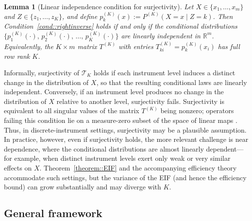 \documentclass[11pt]{article}
\theoremstyle{plain}
\newtheorem{lemma}{Lemma}
\theoremstyle{definition}
\theoremstyle{remark}
\theoremstyle{definition}
\begin{document}
\begin{lemma}[Linear independence condition for surjectivity]
\label{lem:linear-independence}
Let $X \in \{x_1,\ldots,x_m\}$ and $Z \in \{z_1,\ldots,z_K\}$, and define 
$p^{(K)}_k(x) := P^{(K)}(X = x \mid Z = k)$.
Then Condition~\ref{cond::rightinverse} holds if and only if the conditional distributions $\{ p^{(K)}_1(\cdot),\, p^{(K)}_2(\cdot),\,\ldots,\, p^{(K)}_K(\cdot) \}$
are linearly independent in $\mathbb{R}^m$. 
Equivalently, the $K\times m$ matrix $T^{(K)}$ with entries $T_{k i}^{(K)} = p^{(K)}_k(x_i)$ has full row rank $K$.
\end{lemma}
Informally, surjectivity of \(\mathcal{T}_K\) holds if each instrument level
induces a distinct change in the distribution of \(X\), so that the resulting
conditional laws are linearly independent. Conversely, if an instrument level
produces no change in the distribution of \(X\) relative to another level,
surjectivity fails. Surjectivity is equivalent to all singular values of the
matrix \(T^{(K)}\) being nonzero; operators failing this condition lie on a
measure-zero subset of the space of linear maps \citep{horn2012matrix}. Thus,
in discrete-instrument settings, surjectivity may be a plausible
assumption. In practice, however, even if surjectivity holds, the more relevant
challenge is near dependence, where the conditional distributions are almost
linearly dependent---for example, when distinct instrument levels exert only weak
or very similar effects on \(X\). Theorem~\ref{theorem::EIF} and the
accompanying efficiency theory accommodate such settings, but the variance of
the EIF (and hence the efficiency bound) can grow substantially and may
diverge with \(K\).





 
\subsection{General framework}
\label{sec::effgen}
\end{document}
